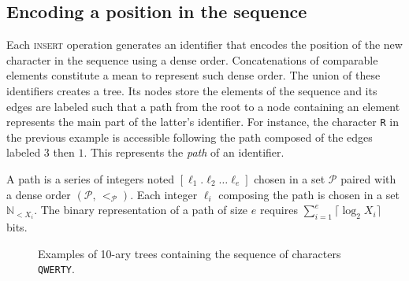 \subsection{Encoding a position in the sequence}
\label{subsec:variable}

Each \textsc{insert} operation generates an identifier that encodes the position
of the new character in the sequence using a dense order. Concatenations of
comparable elements constitute a mean to represent such dense order.
The union of these identifiers creates a tree. Its nodes store the elements of
the sequence and its edges are labeled such that a path from the root to a node
containing an element represents the main part of the latter's identifier. For
instance, the character \texttt{R} in the previous example is accessible
following the path composed of the edges labeled $3$ then $1$.  This represents
the \emph{path} of an identifier.



\begin{definition}[Path]
  A path is a series of integers noted $[\ell_1.\ell_2\ldots \ell_e]$ chosen in a
  set $\mathcal{P}$ paired with a dense order $(\mathcal{P},\, <_\mathcal{P})$.
  Each integer $\ell_i$ composing the path is chosen in a set
  $\mathbb{N}_{<X_i}$. The binary representation of a path of size $e$ requires
  $\textstyle \sum\nolimits_{i=1}^e \lceil \log_2 X_i\rceil$ bits.
\end{definition}


\begin{figure*}
  \centering
  \hspace{20pt}
  \caption{Examples of 10-ary trees containing the sequence of characters
    \texttt{QWERTY}.}
\end{figure*}

